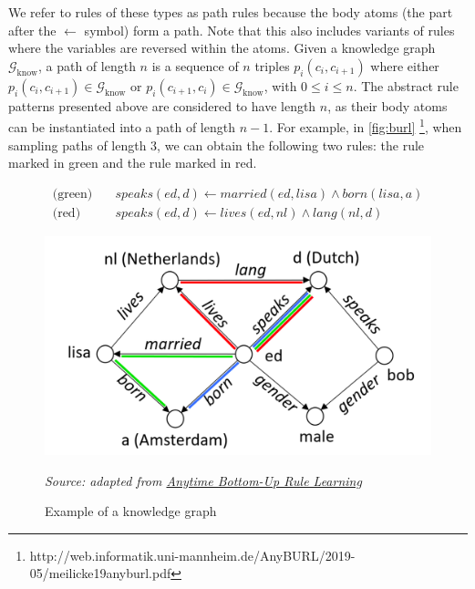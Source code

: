 


We refer to rules of these types as path rules because the body atoms (the part after the \(\gets\) symbol) form a path. Note that this also includes variants of rules where the variables are reversed within the atoms. Given a knowledge graph \(\mathcal{G}_{\text{know}}\), a path of length \(n\) is a sequence of \(n\) triples \(p_i(c_i, c_{i+1})\) where either \(p_i(c_i, c_{i+1}) \in \mathcal{G}_{\text{know}}\) or \(p_i(c_{i+1}, c_i) \in \mathcal{G}_{\text{know}}\), with \(0 \leq i \leq n\). The abstract rule patterns presented above are considered to have length \(n\), as their body atoms can be instantiated into a path of length \(n - 1\). For example, in \autoref{fig:burl} \footnote{http://web.informatik.uni-mannheim.de/AnyBURL/2019-05/meilicke19anyburl.pdf},  
when sampling paths of length 3, we can obtain the following two rules: the rule marked in green and the rule marked in red.

\begin{equation*}
	\begin{aligned}
		\text{(green)} \quad & speaks(ed, d) \gets married(ed, lisa) \wedge born(lisa, a) \\
		\text{(red)} \quad & speaks(ed, d) \gets lives(ed, nl) \wedge lang(nl, d)
	\end{aligned}
\end{equation*}

\begin{figure}[h]
	\centering
	\includegraphics[width=12cm]{images/burl-ago.png}
	\caption{Example of a knowledge graph}
	\label{fig:burl}
	\textit{Source: adapted from \href{http://web.informatik.uni-mannheim.de/AnyBURL/2019-05/meilicke19anyburl.pdf}{Anytime Bottom-Up Rule Learning}}
\end{figure}

